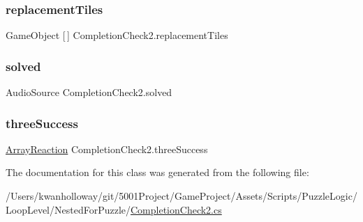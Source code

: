 \mbox{\label{class_completion_check2_a712fc392f7a484070dea22d804bf0ce9}} 
\subsubsection{\texorpdfstring{replacement\+Tiles}{replacementTiles}}
{\footnotesize\ttfamily Game\+Object \mbox{[}$\,$\mbox{]} Completion\+Check2.\+replacement\+Tiles}

\mbox{\label{class_completion_check2_ab543e719625d9de2a48b6817c41c3432}} 
\subsubsection{\texorpdfstring{solved}{solved}}
{\footnotesize\ttfamily Audio\+Source Completion\+Check2.\+solved}

\mbox{\label{class_completion_check2_a5304ab78c9a420165fa605e25ac5bdd6}} 
\subsubsection{\texorpdfstring{three\+Success}{threeSuccess}}
{\footnotesize\ttfamily \hyperlink{class_array_reaction}{Array\+Reaction} Completion\+Check2.\+three\+Success}



The documentation for this class was generated from the following file\+:\begin{DoxyCompactItemize}
\item 
/\+Users/kwanholloway/git/5001\+Project/\+Game\+Project/\+Assets/\+Scripts/\+Puzzle\+Logic/\+Loop\+Level/\+Nested\+For\+Puzzle/\hyperlink{_completion_check2_8cs}{Completion\+Check2.\+cs}\end{DoxyCompactItemize}
